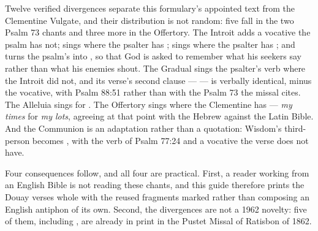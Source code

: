 Twelve verified divergences separate this formulary's appointed text from the
Clementine Vulgate, and their distribution is not random: five fall in the two
Psalm 73 chants and three more in the Offertory. The Introit adds a vocative
the psalm has not; sings  where the psalter has
; sings  where the psalter has
; and turns the psalm's 
into , so that God is asked to remember what his
seekers say rather than what his enemies shout. The Gradual sings the psalter's
verb where the Introit did not, and its verse's second clause ---
 --- is verbally identical, minus
the vocative, with Psalm 88:51 rather than with the Psalm 73 the missal cites.
The Alleluia sings  for . The Offertory sings  where the Clementine
has  --- \textit{my times} for \textit{my lots}, agreeing at
that point with the Hebrew against the Latin Bible. And the Communion is an
adaptation rather than a quotation: Wisdom's third-person  becomes , with the verb of Psalm 77:24 and
a vocative the verse does not have.

Four consequences follow, and all four are practical. First, a reader working
from an English Bible is not reading these chants, and this guide therefore
prints the Douay verses whole with the reused fragments marked rather than
composing an English antiphon of its own. Second, the divergences are not a
1962 novelty: five of them, including , are already in print
in the Pustet Missal of Ratisbon of 1862.


